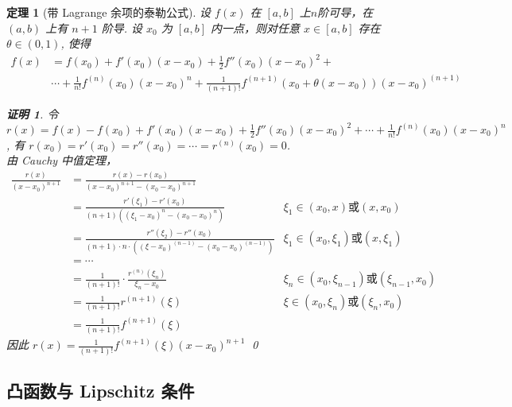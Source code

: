 \documentclass{ctexart}
\newcommand{\。}{．} %
\newenvironment{kuang3}{
    \begin{tcolorbox}[enhanced, colback=hlan!5!white, boxrule=0pt, frame hidden,
        borderline south={0.5mm}{0.1mm}{hlan}]
    }
    {\end{tcolorbox}}
\newenvironment{huangse}{
    \begin{tcolorbox}[enhanced, colback=qhuang, boxrule=0pt, frame hidden,
        borderline west={0.7mm}{0.1mm}{shuang}]
    }
    {\end{tcolorbox}}
\theoremstyle{t} %
\newtheorem{dlhj}{\color{shuang} 定理}[subsection]
\newtheorem*{zmhj}{\color{slan} 证明}
\newenvironment{dl}{\begin{huangse}\begin{dlhj}}{\end{dlhj}\end{huangse}}
\begin{document}
\begin{dl}[带 Lagrange 余项的泰勒公式]
    设 $f(x)$ 在 $[a, b]$ 上$n$阶可导，在 $(a, b)$ 上有 $n + 1$ 阶导. 设 $x_0$ 为 $[a, b]$ 内一点，则对任意 $x \in [a, b]$ 存在 $\theta \in (0, 1)$, 使得
    \begin{align*}
        f(x) & = f(x_0) + f'(x_0)(x - x_0) + \frac{1}{2}f''(x_0)(x - x_0)^2 +  \\
        & \cdots + \frac{1}{n!}f^{(n)}(x_0)(x - x_0)^n + \frac{1}{(n + 1)!}f^{(n + 1)}(x_0 + \theta(x - x_0))(x - x_0)^{(n + 1)}
    \end{align*}
    \begin{zmhj}
        令 $r(x) = f(x) - f(x_0) + f'(x_0)(x - x_0) + \frac{1}{2}f''(x_0)(x - x_0)^2 + \cdots + \frac{1}{n!}f^{(n)}(x_0)(x - x_0)^n$, 有 $r(x_0) = r'(x_0) = r''(x_0) = \cdots = r^{(n)}(x_0) = 0$. \\
        由 Cauchy 中值定理，
        \begin{align*}
            \frac{r(x)}{(x - x_0)^{n + 1}} & = \frac{r(x) - r(x_0)}{(x - x_0)^{n + 1} - (x_0 - x_0)^{n + 1}} \\
            & = \frac{r'(\xi_1) - r'(x_0)}{(n + 1)((\xi_1 - x_0)^n - (x_0 - x_0)^n)} & \xi_1 \in (x_0, x) \text{或} (x, x_0) \\
            & =  \frac{r''(\xi_2) - r''(x_0)}{(n + 1)\cdot n\cdot ((\xi - x_0)^{(n - 1)} - (x_0 - x_0)^{(n - 1)})} & \xi_1 \in (x_0, \xi_1) \text{或} (x, \xi_1) \\
            & = \cdots \\
            & = \frac{1}{(n + 1)!}\cdot \frac{r^{(n)}(\xi_n)}{\xi_n - x_0} & \xi_n \in (x_0, \xi_{n - 1}) \text{或} (\xi_{n - 1}, x_0) \\
            & = \frac{1}{(n + 1)!}r^{(n + 1)}(\xi) & \xi \in (x_0, \xi_{n}) \text{或} (\xi_{n}, x_0) \\
            & = \frac{1}{(n + 1)!}f^{(n + 1)}(\xi)
        \end{align*}
        因此 $r(x) = \frac{1}{(n + 1)!}f^{(n + 1)}(\xi)(x - x_0)^{n + 1}$  \qed
    \end{zmhj}
\end{dl}



\begin{kuang3}
    \subsection{凸函数与 Lipschitz 条件}
\end{kuang3}
\end{document}
